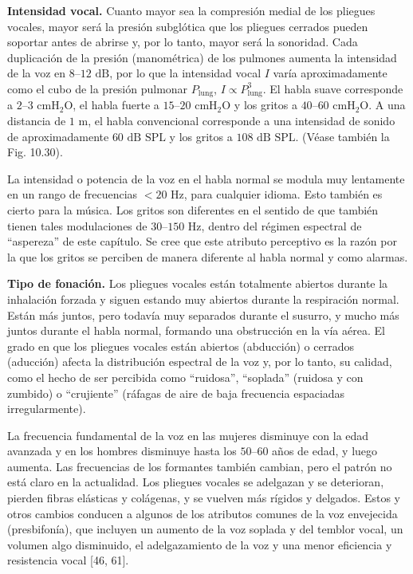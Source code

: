 \documentclass[12pt]{book}
\begin{document}
\textbf{Intensidad vocal.} Cuanto mayor sea la compresión medial de los pliegues vocales, mayor será la presión subglótica que los pliegues cerrados pueden soportar antes de abrirse y, por lo tanto, mayor será la sonoridad. Cada duplicación de la presión (manométrica) de los pulmones aumenta la intensidad de la voz en $8\text{--}12\text{ dB}$, por lo que la intensidad vocal $I$ varía aproximadamente como el cubo de la presión pulmonar $P_{\text{lung}}$, $I \propto P_{\text{lung}}^3$. El habla suave corresponde a $2\text{--}3\text{ cmH}_2\text{O}$, el habla fuerte a $15\text{--}20\text{ cmH}_2\text{O}$ y los gritos a $40\text{--}60\text{ cmH}_2\text{O}$. A una distancia de $1\text{ m}$, el habla convencional corresponde a una intensidad de sonido de aproximadamente $60\text{ dB SPL}$ y los gritos a $108\text{ dB SPL}$. (Véase también la Fig. 10.30).


La intensidad o potencia de la voz en el habla normal se modula muy lentamente en un rango de frecuencias $<20\text{ Hz}$, para cualquier idioma. Esto también es cierto para la música. Los gritos son diferentes en el sentido de que también tienen tales modulaciones de $30\text{--}150\text{ Hz}$, dentro del régimen espectral de ``aspereza'' de este capítulo. Se cree que este atributo perceptivo es la razón por la que los gritos se perciben de manera diferente al habla normal y como alarmas.

\textbf{Tipo de fonación.} Los pliegues vocales están totalmente abiertos durante la inhalación forzada y siguen estando muy abiertos durante la respiración normal. Están más juntos, pero todavía muy separados durante el susurro, y mucho más juntos durante el habla normal, formando una obstrucción en la vía aérea. El grado en que los pliegues vocales están abiertos (abducción) o cerrados (aducción) afecta la distribución espectral de la voz y, por lo tanto, su calidad, como el hecho de ser percibida como ``ruidosa'', ``soplada'' (ruidosa y con zumbido) o ``crujiente'' (ráfagas de aire de baja frecuencia espaciadas irregularmente).

La frecuencia fundamental de la voz en las mujeres disminuye con la edad avanzada y en los hombres disminuye hasta los $50\text{--}60$ años de edad, y luego aumenta. Las frecuencias de los formantes también cambian, pero el patrón no está claro en la actualidad. Los pliegues vocales se adelgazan y se deterioran, pierden fibras elásticas y colágenas, y se vuelven más rígidos y delgados. Estos y otros cambios conducen a algunos de los atributos comunes de la voz envejecida (presbifonía), que incluyen un aumento de la voz soplada y del temblor vocal, un volumen algo disminuido, el adelgazamiento de la voz y una menor eficiencia y resistencia vocal [46, 61].
\end{document}
